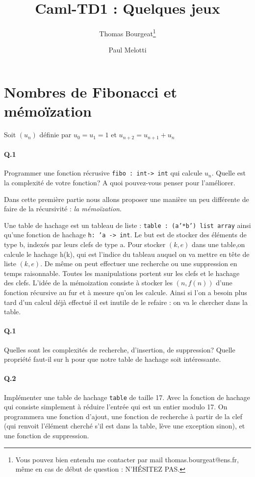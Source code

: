 \documentclass[10pt,a4paper]{article}
\begin{document}
\title{Caml-TD1 : Quelques jeux}
\author{Thomas Bourgeat\footnote{Vous pouvez bien entendu me contacter par mail thomas.bourgeat@ens.fr, même en cas de début de question : N'HÉSITEZ PAS.}\and Paul Melotti}
\maketitle{}

\section{Nombres de Fibonacci et mémoïzation}
Soit $(u_n)$ définie par $u_0=u_1=1$ et $u_{n+2}=u_{n+1}+u_n$
\paragraph{Q.1} Programmer une fonction récrusive \texttt{fibo : int-> int} qui calcule $u_n$. Quelle est la complexité de votre fonction? A quoi pouvez-vous penser pour l'améliorer.

Dans cette première partie nous allons proposer une manière un peu différente de faire de la récursivité : \emph{la mémoïzation}.

Une table de hachage est un tableau de liste : \texttt{table : (a'*b')
list array} ainsi qu'une fonction de hachage \texttt{h: 'a -> int}. Le
but est de stocker des éléments de type b, indexés par leurs clefs de
type a. Pour stocker $(k,e)$ dans une table,on calcule le hachage h(k),
qui est l'indice du tableau auquel on va mettre en tête de liste $(k,e)$. De même on peut effectuer une recherche ou une suppression en temps raisonnable.
Toutes les manipulations portent sur les clefs et le hachage des clefs.
L'idée de la mémoization consiste à stocker les $(n,f(n))$ d'une fonction
récursive au fur et à mesure qu'on les calcule. Ainsi si l'on a besoin plus tard
d'un calcul déjà effectué il est inutile de le refaire  : on va le
chercher dans la table.


\paragraph{Q.1}Quelles sont les complexités de recherche, d'insertion, de
suppression? Quelle propriété faut-il sur h pour que notre table de
hachage soit intéressante.

\paragraph{Q.2} Implémenter une table de hachage \texttt{table} de taille
17. Avec la fonction de hachage qui consiste simplement à réduire
l'entrée qui est un entier modulo 17. On programmera une fonction
d'ajout, une fonction de recherche à partir de la clef (qui renvoit
l'élément cherché s'il est dans la table, lève une exception sinon),
et une fonction de suppression.
\end{document}
